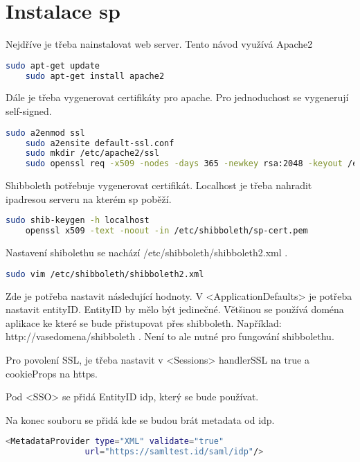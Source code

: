 \section{Instalace sp}

Nejdříve je třeba nainstalovat web server. Tento návod využívá Apache2
\begin{lstlisting}[language=Bash]
    sudo apt-get update
    sudo apt-get install apache2
\end{lstlisting}

Dále je třeba vygenerovat certifikáty pro apache. Pro jednoduchost se vygenerují self-signed.
\begin{lstlisting}[language=Bash]
    sudo a2enmod ssl
    sudo a2ensite default-ssl.conf
    sudo mkdir /etc/apache2/ssl
    sudo openssl req -x509 -nodes -days 365 -newkey rsa:2048 -keyout /etc/apache2/ssl/apache.key -out /etc/apache2/ssl/apache.crt
\end{lstlisting}

Shibboleth potřebuje vygenerovat certifikát. Localhost je třeba nahradit ipadresou serveru na kterém sp poběží.
\begin{lstlisting}[language=Bash]
    sudo shib-keygen -h localhost
    openssl x509 -text -noout -in /etc/shibboleth/sp-cert.pem
\end{lstlisting}

Nastavení shibolethu se nachází /etc/shibboleth/shibboleth2.xml .

\begin{lstlisting}[language=Bash]
   sudo vim /etc/shibboleth/shibboleth2.xml
\end{lstlisting}

Zde je potřeba nastavit následující hodnoty. V <ApplicationDefaults> je potřeba nastavit entityID. EntityID by mělo být jedinečné. Většinou se používá doména aplikace ke které se bude přistupovat přes shibboleth. Například: http://vasedomena/shibboleth . Není to ale nutné pro fungování shibbolethu.

Pro povolení SSL, je třeba nastavit v <Sessions>  handlerSSL na true a cookieProps na https.

Pod <SSO> se přidá EntityID idp, který se bude používat.

Na konec souboru se přidá kde se budou brát metadata od idp.
\begin{lstlisting}[language=Bash]
 <MetadataProvider type="XML" validate="true"
                url="https://samltest.id/saml/idp"/>
\end{lstlisting}

